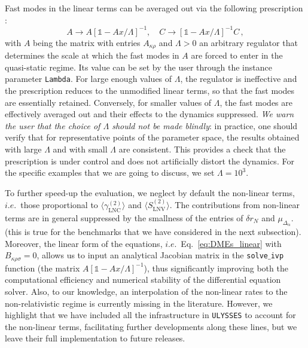 \documentclass[12pt, a4paper]{article}
\def\LNC{\text{LNC}}
\def\LNV{\text{LNV}}
\begin{document}
Fast modes in the linear terms can be averaged out via the following prescription \cite{Klaric:2021cpi}:
\begin{equation}
 A \to A \left[\mathds{1}-A x/\Lambda\right]^{-1},\quad 
 C \to \left[\mathds{1}-A x/\Lambda\right]^{-1} C\,,
\end{equation}
with $A$ being the matrix with entries $A_{\kappa\rho}$ and $\Lambda>0$ an arbitrary regulator that determines the scale at which the fast modes in $A$ are forced to enter in the quasi-static regime. Its value can be set by the user through the instance parameter \texttt{Lambda}. For large enough values of $\Lambda$, the regulator is ineffective and the prescription reduces to the unmodified linear terms, so that the fast modes are essentially retained. Conversely, for smaller values of $\Lambda$, the fast modes are effectively averaged out and their effects to the dynamics suppressed. \emph{We warn the user that the choice of 
$\Lambda$ should not be made blindly}: in practice, one should verify that for representative points of the parameter space, the results obtained with large 
$\Lambda$ and with small 
$\Lambda$ are consistent. This provides a check that the prescription is under control and does not artificially distort the dynamics. For the specific examples that we are going to discuss, we set $\Lambda = 10^3$. 

To further speed-up the evaluation, we neglect by default the non-linear terms, $i.e.$~those proportional to $\langle\gamma_{\LNC}^{(2)}\rangle$ and $\langle S_{\LNV}^{(2)}\rangle$. The contributions from non-linear terms are in general suppressed by the smallness of the entries of $\delta r_N$ and $\mu_{\Delta_{\alpha}}$. 
(this is true for the benchmarks that we have considered in the next subsection). Moreover, the linear form of the equations, $i.e.$~Eq.~\eqref{eq:DMEs_linear} with $B_{\kappa \rho \sigma} = 0$, allows us to input an analytical Jacobian matrix in the \texttt{solve$\_$ivp} function (the matrix $A\left[\mathds{1}-A x/\Lambda\right]^{-1}$), thus significantly improving both the computational efficiency and numerical stability of the differential equation solver. {Also,  to our knowledge, an interpolation of the non-linear rates to the non-relativistic regime is currently missing in the literature.} However, we highlight that we have included all the infrastructure in \texttt{ULYSSES} to account for the non-linear terms, 
{facilitating further developments along these lines, but we leave their full implementation to future releases.}
\end{document}
